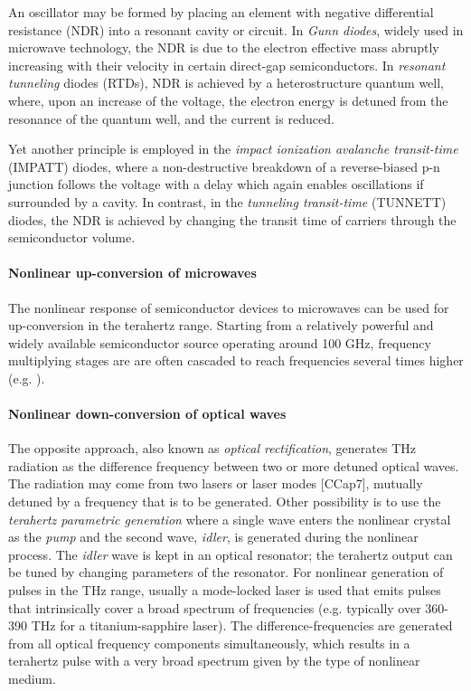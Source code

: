An oscillator may be formed by placing an element with negative differential resistance (NDR) into a resonant cavity or circuit. 
In \textit{Gunn diodes}, widely used in microwave technology, the NDR is due to the electron effective mass abruptly increasing with their velocity in certain direct-gap semiconductors.
In \textit{resonant tunneling} diodes (RTDs)\cite{asada2008resonant,brown1991oscillations}, NDR is achieved by a heterostructure quantum well, where, upon an increase of the voltage, the electron energy is detuned from the resonance of the quantum well, and the current is reduced.

Yet another principle is employed in the \textit{impact ionization avalanche transit-time} (IMPATT) diodes, where a non-destructive breakdown of a reverse-biased p-n junction follows the voltage with a delay which again enables oscillations if surrounded by a cavity. 
In contrast, in the \textit{tunneling transit-time} (TUNNETT) diodes, the NDR is achieved by changing the transit time of carriers through the semiconductor volume.
\paragraph{Nonlinear up-conversion of microwaves}%
The nonlinear response of semiconductor devices to microwaves can be used for up-conversion in the terahertz range. Starting from a relatively powerful and widely available semiconductor source operating around 100 GHz, frequency multiplying stages are are often cascaded to reach frequencies several times higher (e.g. \cite{thomas2012first}).

\paragraph{Nonlinear down-conversion of optical waves}%
The opposite approach, also known as \textit{optical rectification}, generates THz radiation as the difference frequency between two or more detuned optical waves.
The radiation may come from two lasers or laser modes [CCap7], mutually detuned by a frequency that is to be generated. %
Other possibility is to use the \textit{terahertz parametric generation} where a single wave enters the nonlinear crystal as the \textit{pump} and the second wave, \textit{idler}, is generated during the nonlinear process. The \textit{idler} wave is kept in an optical resonator; the terahertz output can be tuned by changing parameters of the resonator. 
For nonlinear generation of pulses in the THz range, usually a mode-locked laser is used that emits pulses that intrinsically cover a broad spectrum of frequencies (e.g. typically over 360-390 THz for a titanium-sapphire laser). The difference-frequencies are generated from all optical frequency components simultaneously, which results in a terahertz pulse with a very broad spectrum given by the type of nonlinear medium. 

